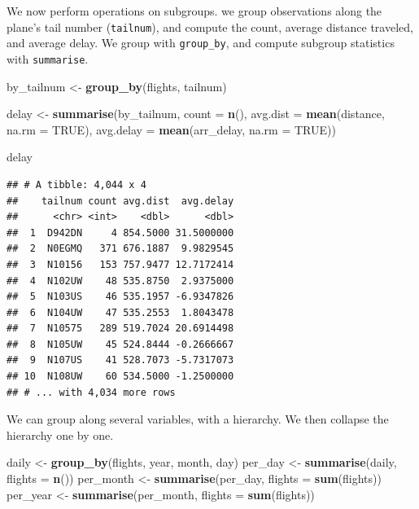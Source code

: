 \documentclass[]{book}
\newenvironment{Shaded}{\begin{snugshade}}{\end{snugshade}}
\newcommand{\KeywordTok}[1]{\textcolor[rgb]{0.13,0.29,0.53}{\textbf{#1}}}
\newcommand{\DataTypeTok}[1]{\textcolor[rgb]{0.13,0.29,0.53}{#1}}
\newcommand{\StringTok}[1]{\textcolor[rgb]{0.31,0.60,0.02}{#1}}
\newcommand{\OtherTok}[1]{\textcolor[rgb]{0.56,0.35,0.01}{#1}}
\newcommand{\NormalTok}[1]{#1}
\theoremstyle{definition}
\theoremstyle{definition}
\theoremstyle{definition}
\theoremstyle{remark}
\begin{document}
We now perform operations on subgroups. we group observations along the
plane's tail number (\texttt{tailnum}), and compute the count, average
distance traveled, and average delay. We group with \texttt{group\_by},
and compute subgroup statistics with \texttt{summarise}.

\begin{Shaded}
\begin{Highlighting}[]
\NormalTok{by_tailnum <-}\StringTok{ }\KeywordTok{group_by}\NormalTok{(flights, tailnum)}

\NormalTok{delay <-}\StringTok{ }\KeywordTok{summarise}\NormalTok{(by_tailnum,}
  \DataTypeTok{count =} \KeywordTok{n}\NormalTok{(),}
  \DataTypeTok{avg.dist =} \KeywordTok{mean}\NormalTok{(distance, }\DataTypeTok{na.rm =} \OtherTok{TRUE}\NormalTok{),}
  \DataTypeTok{avg.delay =} \KeywordTok{mean}\NormalTok{(arr_delay, }\DataTypeTok{na.rm =} \OtherTok{TRUE}\NormalTok{))}

\NormalTok{delay}
\end{Highlighting}
\end{Shaded}

\begin{verbatim}
## # A tibble: 4,044 x 4
##    tailnum count avg.dist  avg.delay
##      <chr> <int>    <dbl>      <dbl>
##  1  D942DN     4 854.5000 31.5000000
##  2  N0EGMQ   371 676.1887  9.9829545
##  3  N10156   153 757.9477 12.7172414
##  4  N102UW    48 535.8750  2.9375000
##  5  N103US    46 535.1957 -6.9347826
##  6  N104UW    47 535.2553  1.8043478
##  7  N10575   289 519.7024 20.6914498
##  8  N105UW    45 524.8444 -0.2666667
##  9  N107US    41 528.7073 -5.7317073
## 10  N108UW    60 534.5000 -1.2500000
## # ... with 4,034 more rows
\end{verbatim}

We can group along several variables, with a hierarchy. We then collapse
the hierarchy one by one.

\begin{Shaded}
\begin{Highlighting}[]
\NormalTok{daily <-}\StringTok{ }\KeywordTok{group_by}\NormalTok{(flights, year, month, day)}
\NormalTok{per_day   <-}\StringTok{ }\KeywordTok{summarise}\NormalTok{(daily, }\DataTypeTok{flights =} \KeywordTok{n}\NormalTok{())}
\NormalTok{per_month <-}\StringTok{ }\KeywordTok{summarise}\NormalTok{(per_day, }\DataTypeTok{flights =} \KeywordTok{sum}\NormalTok{(flights))}
\NormalTok{per_year  <-}\StringTok{ }\KeywordTok{summarise}\NormalTok{(per_month, }\DataTypeTok{flights =} \KeywordTok{sum}\NormalTok{(flights))}
\end{Highlighting}
\end{Shaded}
\end{document}
